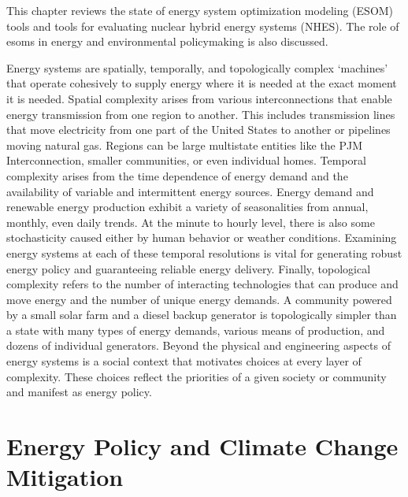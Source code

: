 This chapter reviews the state of energy system optimization modeling (ESOM) tools
and tools for evaluating nuclear hybrid energy systems (NHES). The role of \glspl{esom}
in energy and environmental policymaking is also discussed.

Energy systems are spatially, temporally, and topologically complex ‘machines’
that operate cohesively to supply energy where it is needed at the exact moment
it is needed. Spatial complexity arises from various interconnections that enable
energy transmission from one region to another. This includes transmission
lines that move electricity from one part of the United States to another or
pipelines moving natural gas. Regions can be large multistate entities like the
PJM Interconnection, smaller communities, or even individual homes. Temporal
complexity arises from the time dependence of energy demand and the availability of
variable and intermittent energy sources. Energy demand and renewable energy
production
exhibit a variety of seasonalities from annual, monthly, even daily trends.
At the minute to hourly level, there is also some stochasticity caused either by
human behavior or weather conditions.
Examining energy systems at each of these temporal resolutions is vital for
generating robust energy policy and guaranteeing reliable energy delivery. Finally,
topological complexity refers to the number of interacting technologies that can
produce and move energy and the number of unique energy demands.
A community powered by a small solar farm and a diesel
backup generator is topologically simpler than a state with many types of energy
demands, various means of production, and dozens of individual generators. Beyond
the physical and engineering aspects of energy systems is a social context that
motivates choices at every layer of complexity. These choices reflect the priorities
of a given society or community and manifest as energy policy.

\section{Energy Policy and Climate Change Mitigation}

